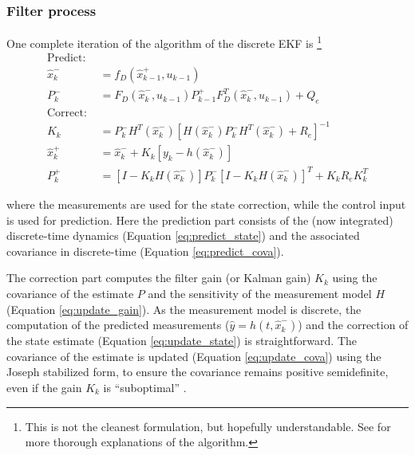 \subsubsection{Filter process}
One complete iteration of the algorithm of the discrete EKF is \cite{lewis2008, werner2021b, minh2012} \footnote{This is not the cleanest formulation, but hopefully understandable. See \cite[pp. 259]{lewis2008} for more thorough explanations of the algorithm.}
\begin{align}
    \text{Predict: } \nonumber \\
     \hat x_k^- &= f_D(\hat x_{k-1}^+, u_{k-1}) \label{eq:predict_state} \\
    P_k^- &= F_D(\hat x_k^-, u_{k-1}) P_{k-1}^+ F_D^T(\hat x_k^-, u_{k-1}) + Q_e \label{eq:predict_cova}  \\
     \text{Correct: } \nonumber \\
    K_{k} &= P_{k}^{-} H^T(\hat x_{k}^{-}) \left[ H(\hat x_{k}^{-}) P_{k}^{-} H^T(\hat x_{k}^{-}) + R_e \right]^{-1} \label{eq:update_gain} \\
    \hat x_{k}^{+} &= \hat x_{k}^{-} + K_{k} \left[ y_{k} - h(\hat x_{k}^{-}) \right] \label{eq:update_state}\\
    P_{k}^{+} &= \left[ I - K_{k} H(\hat x_{k}^{-}) \right] P_{k}^{-}\left[ I - K_{k} H(\hat x_{k}^{-}) \right]^T +  K_{k} R_e K_{k}^T \label{eq:update_cova}
\end{align}

where the measurements are used for the state correction, while the control input is used for prediction.
Here the prediction part consists of the (now integrated) discrete-time dynamics (Equation \ref{eq:predict_state}) and the associated covariance in discrete-time (Equation \ref{eq:predict_cova}).

The correction part computes the filter gain (or Kalman gain) $K_k$ using the covariance of the estimate $P$ and the sensitivity of the measurement model $H$ (Equation \ref{eq:update_gain}).
As the measurement model is discrete, the computation of the predicted measurements ($\hat y = h(t,\hat x_k^-)$) and the correction of the state estimate (Equation \ref{eq:update_state}) is straightforward.
The covariance of the estimate is updated  (Equation \ref{eq:update_cova}) using the Joseph stabilized form, to ensure the covariance remains positive semidefinite, even if the gain $K_k$ is ``suboptimal'' \cite{lewis2008}.

